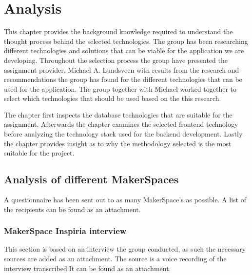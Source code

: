 \chapter{Analysis}
This chapter provides the background knowledge required to understand the thought process behind the selected technologies.
The group has been researching different technologies and solutions that can be viable for the application we are developing. Throughout the selection process the group have presented the assignment provider, Michael A. Lundsveen with results from the research and recommendations the group has found for the different technologies that can be used for the application. The group together with Michael worked together to select which technologies that should be used based on the this research.

The chapter first inspects the database technologies that are suitable for the assignment.
Afterwards the chapter examines the selected frontend technology before analyzing the technology stack used for the backend development.
Lastly the chapter provides insight as to why the methodology selected is the most suitable for the project.

\section{Analysis of different MakerSpaces}
 A questionnaire has been sent out to as many MakerSpace's as possible. A list of the recipients can be found as an attachment.    

\subsection{MakerSpace Inspiria interview}

This section is based on an interview the group conducted, as such the necessary sources are added as an attachment. The source is a voice recording of the interview transcribed.It can be found as an attachment.  

